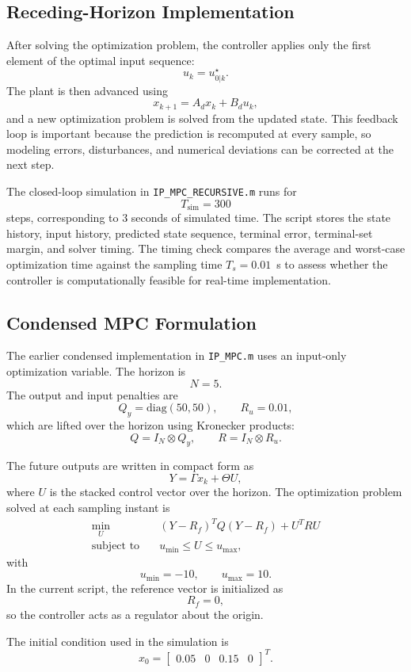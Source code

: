 \documentclass[conference]{IEEEtran}
\begin{document}
\subsection{Receding-Horizon Implementation}
After solving the optimization problem, the controller applies only the first element of the optimal input sequence:
\[
u_k = u_{0|k}^{\star}.
\]
The plant is then advanced using
\[
x_{k+1}=A_d x_k+B_d u_k,
\]
and a new optimization problem is solved from the updated state. This feedback loop is important because the prediction is recomputed at every sample, so modeling errors, disturbances, and numerical deviations can be corrected at the next step.

The closed-loop simulation in \texttt{IP\_MPC\_RECURSIVE.m} runs for
\[
T_{\mathrm{sim}}=300
\]
steps, corresponding to $3$ seconds of simulated time. The script stores the state history, input history, predicted state sequence, terminal error, terminal-set margin, and solver timing. The timing check compares the average and worst-case optimization time against the sampling time $T_s=0.01$~s to assess whether the controller is computationally feasible for real-time implementation.

\subsection{Condensed MPC Formulation}
The earlier condensed implementation in \texttt{IP\_MPC.m} uses an input-only optimization variable. The horizon is
\[
N = 5.
\]
The output and input penalties are
\[
Q_y = \mathrm{diag}(50,50), \qquad R_u = 0.01,
\]
which are lifted over the horizon using Kronecker products:
\[
Q = I_N \otimes Q_y, \qquad R = I_N \otimes R_u.
\]

The future outputs are written in compact form as
\[
Y = \Gamma x_k + \Theta U,
\]
where $U$ is the stacked control vector over the horizon. The optimization problem solved at each sampling instant is
\begin{align*}
\min_U \quad & (Y-R_f)^TQ(Y-R_f) + U^TRU \\
\text{subject to} \quad & u_{\min} \le U \le u_{\max},
\end{align*}
with
\[
u_{\min}=-10, \qquad u_{\max}=10.
\]
In the current script, the reference vector is initialized as
\[
R_f = 0,
\]
so the controller acts as a regulator about the origin.

The initial condition used in the simulation is
\[
x_0 =
\begin{bmatrix}
0.05 & 0 & 0.15 & 0
\end{bmatrix}^T.
\]
\end{document}
